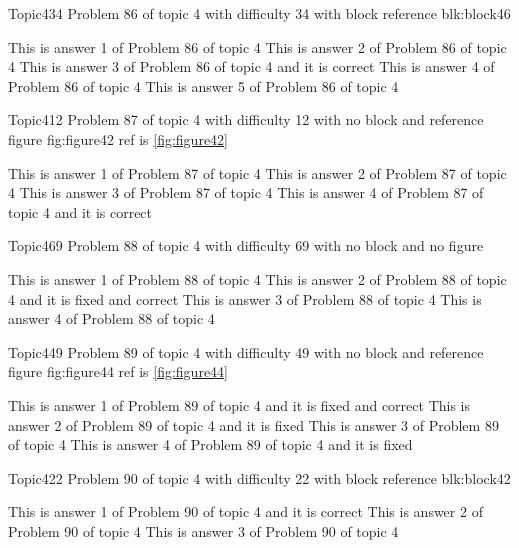 \documentclass[master]{exam}
\begin{document}
\begin{problem}[requires=blk:block46]{Topic4}{34}
	Problem 86 of topic 4 with difficulty 34 with block reference blk:block46
	\begin{answers}
		\answer This is answer 1 of Problem 86 of topic 4 
		\answer This is answer 2 of Problem 86 of topic 4 
		\answer[correct] This is answer 3 of Problem 86 of topic 4 and it is correct
		\answer This is answer 4 of Problem 86 of topic 4 
		\answer This is answer 5 of Problem 86 of topic 4 
	\end{answers}
\end{problem}

\begin{problem}{Topic4}{12}
	Problem 87 of topic 4 with difficulty 12 with no block and reference figure fig:figure42 ref is \ref{fig:figure42}
	\begin{answers}
		\answer This is answer 1 of Problem 87 of topic 4 
		\answer This is answer 2 of Problem 87 of topic 4 
		\answer This is answer 3 of Problem 87 of topic 4 
		\answer[correct] This is answer 4 of Problem 87 of topic 4 and it is correct
	\end{answers}
\end{problem}

\begin{problem}{Topic4}{69}
	Problem 88 of topic 4 with difficulty 69 with no block and no figure
	\begin{answers}
		\answer This is answer 1 of Problem 88 of topic 4 
		 This is answer 2 of Problem 88 of topic 4 and it is fixed and correct
		\answer This is answer 3 of Problem 88 of topic 4 
		\answer This is answer 4 of Problem 88 of topic 4 
	\end{answers}
\end{problem}

\begin{problem}{Topic4}{49}
	Problem 89 of topic 4 with difficulty 49 with no block and reference figure fig:figure44 ref is \ref{fig:figure44}
	\begin{answers}
		 This is answer 1 of Problem 89 of topic 4 and it is fixed and correct
		\answer[fixed] This is answer 2 of Problem 89 of topic 4 and it is fixed
		\answer This is answer 3 of Problem 89 of topic 4 
		\answer[fixed] This is answer 4 of Problem 89 of topic 4 and it is fixed
	\end{answers}
\end{problem}

\begin{problem}[requires=blk:block42]{Topic4}{22}
	Problem 90 of topic 4 with difficulty 22 with block reference blk:block42
	\begin{answers}
		\answer[correct] This is answer 1 of Problem 90 of topic 4 and it is correct
		\answer This is answer 2 of Problem 90 of topic 4 
		\answer This is answer 3 of Problem 90 of topic 4 
	\end{answers}
\end{problem}
\end{document}
